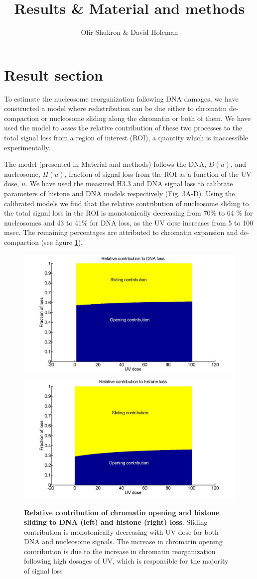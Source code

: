 \documentclass[12pt]{article}
\begin{document}
	
\title{Results \& Material and methods}
\author{Ofir Shukron \& David Holcman}
\maketitle

\section{Result section}

To estimate the nucleosome reorganization following DNA damages, we have constructed a model where redistribution can be due either to chromatin de-compaction or nucleosome sliding along the chromatin or both of them. We have used the model to asses the relative contribution of these two processes to the total signal loss from a region of interest (ROI), a quantity which is inaccessible experimentally. 

The model (presented in Material and methods) follows the DNA, $D(u)$, and nucleosome, $H(u)$, fraction of signal loss from the ROI as a function of the UV dose, $u$. We have used the measured H3.3 and DNA signal loss to calibrate parameters of histone and DNA models respectively (Fig. 3A-D). Using the calibrated models we find that the relative contribution of nucleosome sliding to the total signal loss in the ROI is monotonically decreasing from 70\% to 64 \% for nucleosomes and 43 to 41\% for DNA loss, as the UV dose increases from 5 to 100 msec. The remaining percentages are attributed to chromatin expansion and de-compaction (see figure \ref{fig:relatiiveContributionToLoss}).

\begin{figure}[H]
	\includegraphics[width=0.5\linewidth, height=0.3\textheight]{relatiiveContributionToDNALoss}
	\includegraphics[width=0.5\linewidth, height=0.3\textheight]{relativeContributionToHistoneLoss}
	\caption{\textbf{Relative contribution of chromatin opening and histone sliding to DNA (left) and histone (right) loss}. Sliding contribution is monotonically decreasing with UV dose for both DNA and nucleosome signals. The increase in chromatin opening contribution is due to the increase in chromatin reorganization following high dosages of UV, which is responsible for the majority of signal loss}
	\label{fig:relatiiveContributionToLoss}
\end{figure}
\end{document}
